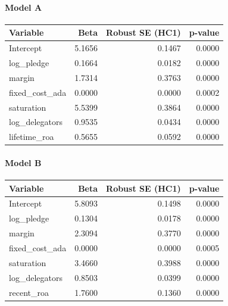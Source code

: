 \documentclass[11pt]{article}
\begin{document}
\paragraph{Model A}
\begin{table}[h]
\centering
\small
\begin{tabular}{lrrr}
\toprule
Variable & Beta & Robust SE (HC1) & p-value \\
\midrule
Intercept & 5.1656 & 0.1467 & 0.0000 \\
log\_pledge & 0.1664 & 0.0182 & 0.0000 \\
margin & 1.7314 & 0.3763 & 0.0000 \\
fixed\_cost\_ada & 0.0000 & 0.0000 & 0.0002 \\
saturation & 5.5399 & 0.3864 & 0.0000 \\
log\_delegators & 0.9535 & 0.0434 & 0.0000 \\
lifetime\_roa & 0.5655 & 0.0592 & 0.0000 \\
\bottomrule
\end{tabular}
\end{table}

\paragraph{Model B}
\begin{table}[h]
\centering
\small
\begin{tabular}{lrrr}
\toprule
Variable & Beta & Robust SE (HC1) & p-value \\
\midrule
Intercept & 5.8093 & 0.1498 & 0.0000 \\
log\_pledge & 0.1304 & 0.0178 & 0.0000 \\
margin & 2.3094 & 0.3770 & 0.0000 \\
fixed\_cost\_ada & 0.0000 & 0.0000 & 0.0005 \\
saturation & 3.4660 & 0.3988 & 0.0000 \\
log\_delegators & 0.8503 & 0.0399 & 0.0000 \\
recent\_roa & 1.7600 & 0.1360 & 0.0000 \\
\bottomrule
\end{tabular}
\end{table}
\end{document}
